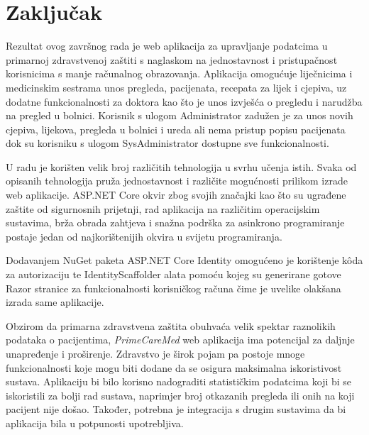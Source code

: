 \section{Zaključak}

Rezultat ovog završnog rada je web aplikacija za upravljanje podatcima u primarnoj zdravstvenoj zaštiti s naglaskom na jednostavnost i pristupačnost korisnicima s manje računalnog obrazovanja. Aplikacija omogućuje liječnicima i medicinskim sestrama unos pregleda, pacijenata, recepata za lijek i cjepiva, uz dodatne funkcionalnosti za doktora kao što je unos izvješća o pregledu i narudžba na pregled u bolnici. Korisnik s ulogom Administrator zadužen je za unos novih cjepiva, lijekova, pregleda u bolnici i ureda ali nema pristup popisu pacijenata dok su korisniku s ulogom SysAdministrator dostupne sve funkcionalnosti.

U radu je korišten velik broj različitih tehnologija u svrhu učenja istih. Svaka od opisanih tehnologija pruža jednostavnost i različite mogućnosti prilikom izrade web aplikacije. ASP.NET Core okvir zbog svojih značajki kao što su ugrađene zaštite od sigurnosnih prijetnji, rad aplikacija na različitim operacijskim sustavima, brža obrada zahtjeva i snažna podrška za asinkrono programiranje postaje jedan od najkorištenijih okvira u svijetu programiranja.
  
Dodavanjem NuGet paketa ASP.NET Core Identity omogućeno je korištenje k\^oda za autorizaciju te IdentityScaffolder alata pomoću kojeg su generirane gotove Razor stranice za funkcionalnosti korisničkog računa čime je uvelike olakšana izrada same aplikacije. 

Obzirom da primarna zdravstvena zaštita obuhvaća velik spektar raznolikih podataka o pacijentima, \textit{PrimeCareMed} web aplikacija ima potencijal za daljnje unapređenje i proširenje. Zdravstvo je širok pojam pa postoje mnoge funkcionalnosti koje mogu biti dodane da se osigura maksimalna iskoristivost sustava. Aplikaciju bi bilo korisno nadograditi statističkim podatcima koji bi se iskoristili za bolji rad sustava, naprimjer broj otkazanih pregleda ili onih na koji pacijent nije došao. Također, potrebna je integracija s drugim sustavima da bi aplikacija bila u potpunosti upotrebljiva.


